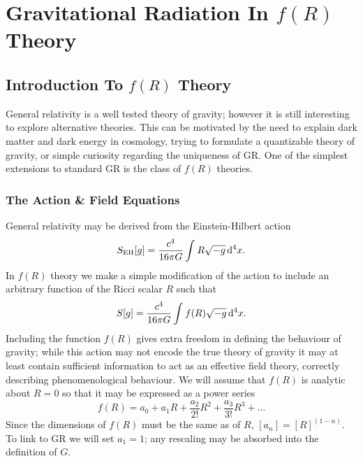 \chapter{Gravitational Radiation In $f(R)$ Theory}

\section{Introduction To $f(R)$ Theory}

General relativity is a well tested theory of gravity\cite{Will2006}; however it is still interesting to explore alternative theories. This can be motivated by the need to explain dark matter and dark energy in cosmology, trying to formulate a quantizable theory of gravity, or simple curiosity regarding the uniqueness of GR. One of the simplest extensions to standard GR is the class of $f(R)$ theories\cite{Sotiriou2010, DeFelice2010}.

\subsection{The Action \& Field Equations}\label{sec:Action}

General relativity may be derived from the Einstein-Hilbert action\cite{Misner1973, Landau1975}
\begin{equation}
S_\mathrm{EH}[g] = \frac{c^4}{16\pi G}\int_{}^{}{R\sqrt{-g}}\,\mathrm{d}{^4x}.
\end{equation}
In $f(R)$ theory we make a simple modification of the action to include an arbitrary function of the Ricci scalar $R$ such that\cite{Buchdahl1970}
\begin{equation}
S[g] = \frac{c^4}{16\pi G}\int_{}^{}{f(R)\sqrt{-g}}\,\mathrm{d}{^4x}.
\end{equation}
Including the function $f(R)$ gives extra freedom in defining the behaviour of gravity; while this action may not encode the true theory of gravity it may at least contain sufficient information to act as an effective field theory, correctly describing phenomenological behaviour\cite{Park2010}. We will assume that $f(R)$ is analytic about $R = 0$ so that it may be expressed as a power series\cite{Buchdahl1970, Psaltis2008}
\begin{equation}
f(R) = a_0 + a_1 R + \frac{a_2}{2!}R^2 + \frac{a_3}{3!}R^3 + \ldots
\end{equation}
Since the dimensions of $f(R)$ must be the same as of $R$, $[a_n] = [R]^{(1-n)}$. To link to GR we will set $a_1 = 1$; any rescaling may be absorbed into the definition of $G$.

